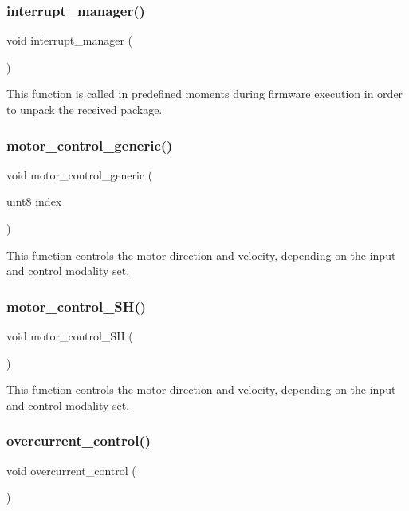 \subsubsection{interrupt\+\_\+manager()}
{\footnotesize\ttfamily void interrupt\+\_\+manager (\begin{DoxyParamCaption}{ }\end{DoxyParamCaption})}

This function is called in predefined moments during firmware execution in order to unpack the received package. \mbox{\label{interruptions_8h_af17859273d717ee4b7c575ec7644e308}} 
\subsubsection{motor\+\_\+control\+\_\+generic()}
{\footnotesize\ttfamily void motor\+\_\+control\+\_\+generic (\begin{DoxyParamCaption}\item[{uint8}]{index }\end{DoxyParamCaption})}

This function controls the motor direction and velocity, depending on the input and control modality set. \mbox{\label{interruptions_8h_a17436ec2a3bf0398e965c63c8e1a089d}} 
\subsubsection{motor\+\_\+control\+\_\+\+S\+H()}
{\footnotesize\ttfamily void motor\+\_\+control\+\_\+\+SH (\begin{DoxyParamCaption}{ }\end{DoxyParamCaption})}

This function controls the motor direction and velocity, depending on the input and control modality set. \mbox{\label{interruptions_8h_a4e92908805632dc8cab2936d89bb3ba1}} 
\subsubsection{overcurrent\+\_\+control()}
{\footnotesize\ttfamily void overcurrent\+\_\+control (\begin{DoxyParamCaption}{ }\end{DoxyParamCaption})}

